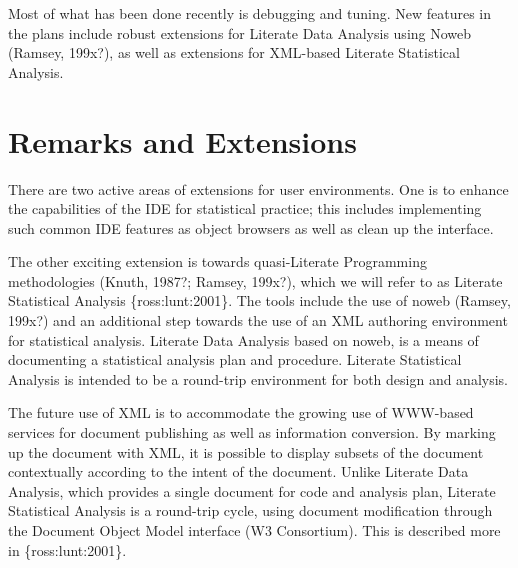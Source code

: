 \documentclass{article}
\newcommand{\citep}[1]{{\{\sf#1\}}}
\begin{document}
Most of what has been done recently is debugging and tuning.  New
features in the plans include robust extensions for Literate Data
Analysis using Noweb (Ramsey, 199x?), as well as extensions for
XML-based Literate Statistical Analysis.

\section{Remarks and Extensions}
\label{sec:remarks}

There are two active areas of extensions for user environments.  One
is to enhance the capabilities of the IDE for statistical practice;
this includes implementing such common IDE features as object browsers
as well as clean up the interface.

The other exciting extension is towards quasi-Literate Programming
methodologies (Knuth, 1987?; Ramsey, 199x?), which we will refer to as
Literate Statistical Analysis \citep{ross:lunt:2001}. The tools include
the use of noweb (Ramsey, 199x?) and an additional step towards the
use of an XML authoring environment for statistical analysis.
Literate Data Analysis based on noweb, is a means of documenting a
statistical analysis plan and procedure.  Literate Statistical
Analysis is intended to be a round-trip environment for both design
and analysis.

The future use of XML is to accommodate the growing use of WWW-based
services for document publishing as well as information conversion.
By marking up the document with XML, it is possible to display subsets
of the document contextually according to the intent of the document.
Unlike Literate Data Analysis, which provides a single document for
code and analysis plan, Literate Statistical Analysis is a round-trip
cycle, using document modification through the Document Object Model
interface (W3 Consortium).  This is described more in
\citep{ross:lunt:2001}. 



\end{document}

